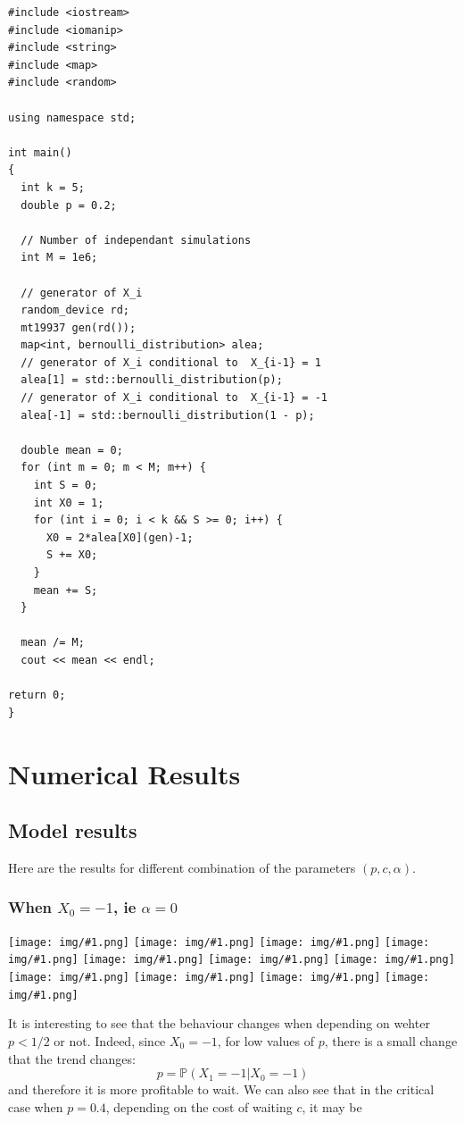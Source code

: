 \documentclass{article}
\newcommand{\IMG}[1] { \texttt{[image: img/\#1.png]} }
\newcommand{\IMGG}[1] { \texttt{[image: img/\#1.png]} }
\begin{document}
\begin{verbatim}
#include <iostream>
#include <iomanip>
#include <string>
#include <map>
#include <random>

using namespace std;

int main()
{
  int k = 5;
  double p = 0.2;

  // Number of independant simulations
  int M = 1e6;

  // generator of X_i
  random_device rd;
  mt19937 gen(rd());
  map<int, bernoulli_distribution> alea;
  // generator of X_i conditional to  X_{i-1} = 1
  alea[1] = std::bernoulli_distribution(p);
  // generator of X_i conditional to  X_{i-1} = -1
  alea[-1] = std::bernoulli_distribution(1 - p);
  
  double mean = 0;
  for (int m = 0; m < M; m++) {
    int S = 0;
    int X0 = 1;
    for (int i = 0; i < k && S >= 0; i++) {
      X0 = 2*alea[X0](gen)-1;
      S += X0;
    }
    mean += S;
  }
  
  mean /= M;
  cout << mean << endl;
  
return 0;
}
\end{verbatim}

\newpage

\section{Numerical Results}


\subsection{Model results}
Here are the results for different combination of the parameters $(p, c, \alpha)$.
\subsubsection*{When $X_0 = -1$, ie $\alpha=0$}

\begin{center}
\IMGG{legend}
\IMG{0}
\IMG{1} 
\IMG{2} 
\IMG{3} 
\IMG{4} 
\IMG{5} 
\IMG{7} 
\IMG{8} 
\IMG{9} 
\IMG{10}
\end{center}

It is interesting to see that the behaviour changes when depending on wehter $p < 1/2$ or not. Indeed, since $X_0 = -1$, for low values of $p$, there is a small change that the trend changes:
$$ p = \mathbb P (X_1 = -1 | X_0 = -1) $$
 and therefore it is more profitable to wait.
We can also see that in the critical case when $p = 0.4$, depending on the cost of waiting $c$, it may be 
\end{document}
